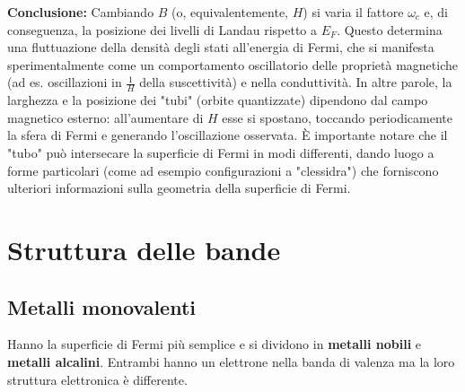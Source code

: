 \bigskip
\noindent
\textbf{Conclusione:}  
Cambiando \(B\) (o, equivalentemente, \(H\)) si varia il fattore \(\omega_c\) e, di conseguenza, la posizione dei livelli di Landau rispetto a \(E_F\). Questo determina una fluttuazione della densità degli stati all'energia di Fermi, che si manifesta sperimentalmente come un comportamento oscillatorio delle proprietà magnetiche (ad es. oscillazioni in \(\frac{1}{H}\) della suscettività) e nella conduttività.  
In altre parole, la larghezza e la posizione dei "tubi" (orbite quantizzate) dipendono dal campo magnetico esterno: all'aumentare di \(H\) esse si spostano, toccando periodicamente la sfera di Fermi e generando l'oscillazione osservata.  
È importante notare che il "tubo" può intersecare la superficie di Fermi in modi differenti, dando luogo a forme particolari (come ad esempio configurazioni a "clessidra") che forniscono ulteriori informazioni sulla geometria della superficie di Fermi.




\section{Struttura delle bande}
\subsection{Metalli monovalenti}
Hanno la superficie di Fermi più semplice e si dividono in \textbf{metalli nobili} e \textbf{metalli alcalini}. Entrambi hanno un elettrone nella banda di valenza ma la loro struttura elettronica è differente.\\\\

 
 
